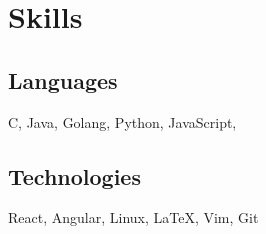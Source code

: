 \documentclass[11pt]{article}
\begin{document}
\section{Skills}
\begin{minipage}{20em}
	\subsection{Languages}
		C, Java, Golang, Python, JavaScript,
\end{minipage}
\begin{minipage}{25em}
	\subsection{Technologies}
	React, Angular, Linux, \LaTeX, Vim, Git 	
\end{minipage}
\end{document}
